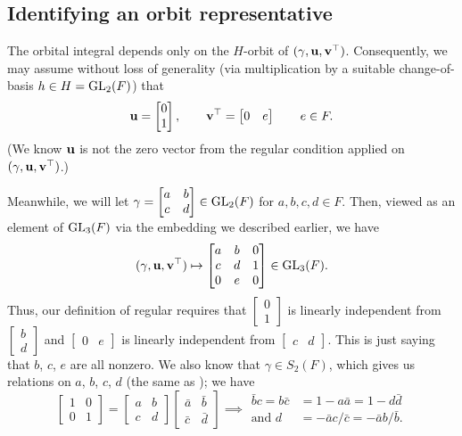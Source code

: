 \subsection{Identifying an orbit representative}
The orbital integral depends only on the $H$-orbit of $(\gamma, \mathbf u, \mathbf v^\top)$.
Consequently, we may assume without loss of generality
(via multiplication by a suitable change-of-basis $h \in H = \operatorname{GL}_2(F)$) that
\[ \mathbf u = \begin{bmatrix} 0 \\ 1 \end{bmatrix}, \qquad
  \mathbf v^\top = \begin{bmatrix} 0 & e \end{bmatrix} \qquad e \in F. \]
(We know $\mathbf u$ is not the zero vector from the regular condition
applied on $(\gamma, \mathbf u, \mathbf v^\top)$.)

Meanwhile, we will let
$\gamma = \begin{bmatrix} a & b \\ c & d \end{bmatrix} \in \operatorname{GL}_2(F)$
for $a,b,c,d \in F$.
Then, viewed as an element of $\operatorname{GL}_3(F)$ via the embedding we described earlier, we have
\[
  (\gamma, \mathbf u, \mathbf v^\top)
  \mapsto \begin{bmatrix}
    a & b & 0 \\
    c & d & 1 \\
    0 & e & 0
  \end{bmatrix} \in \operatorname{GL}_3(F).
\]
Thus, our definition of regular requires that
$\begin{bmatrix} 0 \\ 1 \end{bmatrix}$
is linearly independent from $\begin{bmatrix} b \\ d \end{bmatrix}$
and
$\begin{bmatrix} 0 & e \end{bmatrix}$
is linearly independent from $\begin{bmatrix} c & d \end{bmatrix}$.
This is just saying that $b$, $c$, $e$ are all nonzero.
We also know that $\gamma \in S_2(F)$, which gives us relations on $a$, $b$, $c$, $d$
(the same as \cite[equation (7.3.2)]{ref:AFLspherical}); we have
\[
  \begin{bmatrix} 1 & 0 \\ 0 & 1 \end{bmatrix}
  = \begin{bmatrix} a & b \\ c & d \end{bmatrix} \begin{bmatrix} \bar a & \bar b \\ \bar c & \bar d \end{bmatrix}
  \implies
  \begin{aligned}
    \bar b c = b \bar c &= 1 - a \bar a = 1 - d \bar d \\
    \text{and } d &= - \bar a c / \bar c = -\bar a b / \bar b.
  \end{aligned}
\]

